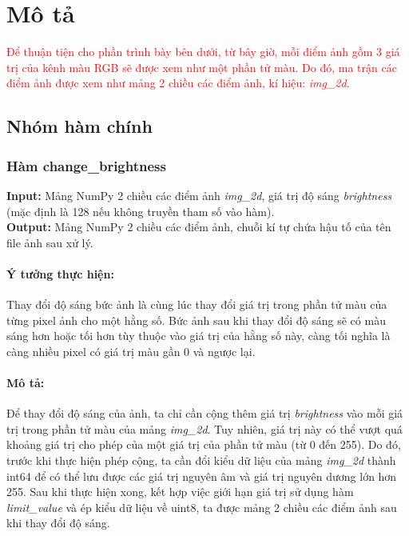 \documentclass{article}
\begin{document}
\section{Mô tả}
\textcolor{red}{Để thuận tiện cho phần trình bày bên dưới, từ bây giờ, mỗi điểm ảnh gồm 3 giá trị của kênh màu RGB sẽ được xem như một phần tử màu. Do đó, ma trận các điểm ảnh được xem như mảng 2 chiều các điểm ảnh, kí hiệu: \textit{img\_2d}. }

\subsection{Nhóm hàm chính}
\subsubsection{Hàm change\_brightness}
\textbf{Input:} Mảng NumPy 2 chiều các điểm ảnh \textit{img\_2d}, giá trị độ sáng \textit{brightness} (mặc định là 128 nếu không truyền tham số vào hàm). \\
\textbf{Output:} Mảng NumPy 2 chiều các điểm ảnh, chuỗi kí tự chứa hậu tố của tên file ảnh sau xử lý.

\paragraph{Ý tưởng thực hiện:} Thay đổi độ sáng bức ảnh là cùng lúc thay đổi giá trị trong phần tử màu của từng pixel ảnh cho một hằng số. Bức ảnh sau khi thay đổi độ sáng sẽ có màu sáng hơn hoặc tối hơn tùy thuộc vào giá trị của hằng số này, càng tối nghĩa là càng nhiều pixel có giá trị màu gần 0 và ngược lại.

\paragraph{Mô tả:} Để thay đổi độ sáng của ảnh, ta chỉ cần cộng thêm giá trị \textit{brightness} vào mỗi giá trị trong phần tử màu của mảng \textit{img\_2d}. Tuy nhiên, giá trị này có thể vượt quá khoảng giá trị cho phép của một giá trị của phần tử màu (từ 0 đến 255). Do đó, trước khi thực hiện phép cộng, ta cần đổi kiểu dữ liệu của mảng \textit{img\_2d} thành int64 để có thể lưu được các giá trị nguyên âm và giá trị nguyên dương lớn hơn 255. Sau khi thực hiện xong, kết hợp việc giới hạn giá trị sử dụng hàm \textit{limit\_value} và ép kiểu dữ liệu về uint8, ta được mảng 2 chiều các điểm ảnh sau khi thay đổi độ sáng.
\end{document}
